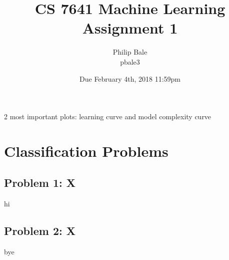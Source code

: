\documentclass[h]{article}
\title{CS 7641 Machine Learning \\ Assignment 1}
\date{Due February 4th, 2018 11:59pm}
\author{Philip Bale \\ pbale3}
\begin{document}
\maketitle


2 most important plots: learning curve and model complexity curve

\section*{Classification Problems}
\subsection*{Problem 1: X}  
hi

\subsection*{Problem 2: X}  
bye
\end{document}
